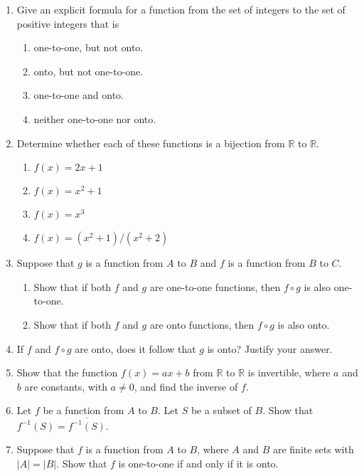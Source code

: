 \documentclass{sig-alternate-05-2015}
\begin{document}
\begin{enumerate}
\item Give an explicit formula for a function from the set of
integers to the set of positive integers that is
	\begin{enumerate}
	\item one-to-one, but not onto.
	\item onto, but not one-to-one.
	\item one-to-one and onto.
	\item neither one-to-one nor onto.
	\end{enumerate}

\item Determine whether each of these functions is a bijection
from $\mathbb{R}$ to $\mathbb{R}$.
	\begin{enumerate}
		\item $f(x)=2x+1$
		\item $f(x)=x^2+1$
		\item $f(x)=x^3$
		\item $f(x)=(x^2+1)/(x^2+2)$
	\end{enumerate}

\item 
Suppose that $g$ is a function from $A$ to $B$ and $f$ is a
function from $B$ to $C$.
	\begin{enumerate}
		\item Show that if both $f$ and $g$ are one-to-one functions,
		then $f\circ g$ is also one-to-one.
		
		\item Show that if both $f$ and $g$ are onto functions, then
		$f \circ  g$ is also onto.
	\end{enumerate}
	
\item If $f$ and $f \circ g$ are onto, does it follow that $g$ is onto?
Justify your answer.

\item Show that the function $f (x) = ax + b$ from  $\mathbb{R}$ to  $\mathbb{R}$ is
invertible, where $a$ and $b$ are constants, with $a\neq 0$, and
find the inverse of $f$.

\item Let $f$ be a function from $A$ to $B$. Let $S$ be a subset of $B$.
Show that $f^{-1}(S)=\overline{f^{-1}(S)}$.

\item Suppose that $f$ is a function from $A$ to $B$, where $A$ and $B$
are finite sets with $|A| = |B|$. Show that $f$ is one-to-one
if and only if it is onto.


\end{enumerate}
\end{document}
